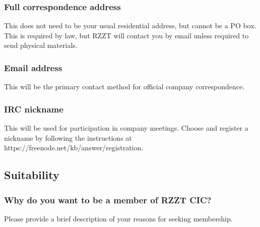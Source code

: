 \documentclass[a4paper,10pt]{article}
\begin{document}
\begin{Form}
\subsubsection{Full correspondence address}

This does not need to be your usual residential address, but cannot be a PO box. This is required by law, but RZZT will contact you by email unless required to send physical materials.

\begin{framed}%
  \TextField[width=\textwidth,donotscroll=true,multiline=true,name=address]{ }%
\end{framed}%

\subsubsection{Email address}

This will be the primary contact method for official company correspondence.

\begin{framed}%
  \TextField[width=\textwidth,donotscroll=true,name=email]{ }%
\end{framed}%

\subsubsection{IRC nickname}

This will be used for participation in company meetings. Choose and register a nickname by following the instructions at https://freenode.net/kb/answer/registration.

\begin{framed}%
  \TextField[width=\textwidth,donotscroll=true,name=ircnick]{ }%
\end{framed}%

\subsection{Suitability}

\subsubsection{Why do you want to be a member of RZZT CIC?}

Please provide a brief description of your reasons for seeking membership.

\begin{framed}%
  \TextField[width=\textwidth,donotscroll=true,multiline=true,name=reasons]{ }%
\end{framed}%


\end{Form}
\end{document}
